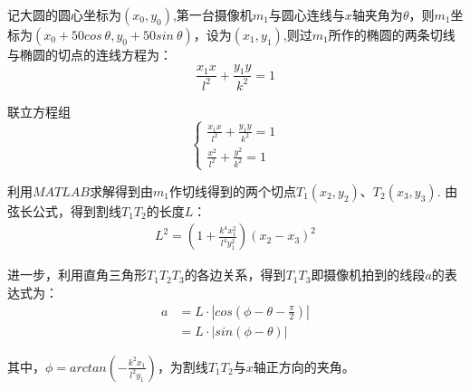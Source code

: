 \documentclass[a4paper,10.5pt]{ctexart}
\begin{document}
记大圆的圆心坐标为$(x_0,y_0)$,第一台摄像机$m_1$与圆心连线与$x$轴夹角为$\theta$，则$m_1$坐标为$(x_0+50cos\ \theta,y_0+50sin\ \theta)$，设为$(x_1,y_1)$,则过$m_1$所作的椭圆的两条切线与椭圆的切点的连线方程为：$$\frac{x_1x}{l^2}+\frac{y_1y}{k^2}=1$$
\par 联立方程组
\begin{equation}
\nonumber
\left\{
\begin{aligned}
\frac{x_1x}{l^2}+\frac{y_1y}{k^2}=1 \\
\frac{x^2}{l^2}+\frac{y^2}{k^2}=1
\end{aligned}
\right.
\end{equation}
\par 利用$MATLAB$求解得到由$m_1$作切线得到的两个切点$T_1(x_2,y_2)$、$T_2(x_3,y_3)$.
由弦长公式，得到割线$T_1T_2$的长度$L$：
\begin{equation}
\begin{aligned}
L^2=(1+\frac{k^4x_{1}^2}{l^4y_{1}^2})(x_2-x_3)^2
\end{aligned}
\end{equation}
\par 进一步，利用直角三角形$T_1T_2T_3$的各边关系，得到$T_1T_3$即摄像机拍到的线段$a$的表达式为：
\begin{equation}
\begin{aligned}
a&=L·|cos(\phi-\theta-\frac{\pi}{2})|\\
&=L·|sin(\phi-\theta)|
\end{aligned}
\end{equation}
\par 其中，$\phi=arctan(-\frac{k^2x_1}{l^2y_1})$，为割线$T_1T_2$与$x$轴正方向的夹角。
\end{document}
